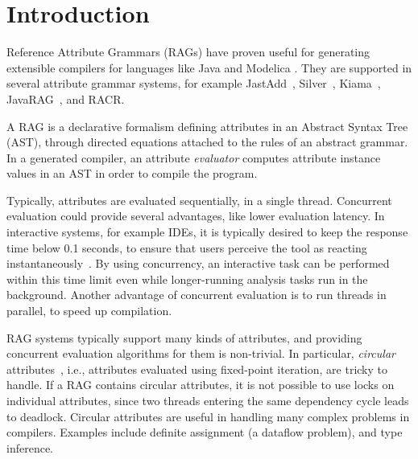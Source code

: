 {\section{Introduction}

Reference Attribute Grammars (RAGs) \cite{DBLP:journals/informaticaSI/Hedin00}
have proven useful for generating extensible compilers for languages
like Java \cite{DBLP:conf/ecoop/WykKBS07, jastaddj} and Modelica \cite{DBLP:journals/cce/AkessonAGBT10}. 
They are supported in several attribute grammar systems, for example
JastAdd~\cite{DBLP:journals/informaticaSI/Hedin00},
Silver~\cite{DBLP:journals/entcs/WykBGK08},
Kiama~\cite{DBLP:journals/entcs/SloaneKV10},
JavaRAG~\cite{DBLP:conf/aosd/ForsCH15},
and RACR\cite{DBLP:conf/sle/Burger15}.

A RAG is a declarative formalism defining attributes in an Abstract Syntax Tree (AST), through
directed equations attached to the rules of an abstract grammar. In a generated compiler,
an attribute \emph{evaluator} computes attribute instance values in an AST in order to compile the program.

Typically, attributes are evaluated sequentially, in a single thread.
Concurrent evaluation could provide several advantages, like lower evaluation latency.
In interactive systems, for example IDEs, it is typically desired to keep the response time below 0.1 seconds, to ensure that users perceive the tool as reacting instantaneously~\cite{DBLP:books/daglib/0076830}. By using concurrency, an interactive task can be performed within this
time limit even while
longer-running analysis tasks run in the background.
Another advantage of concurrent evaluation is to run threads in parallel, to speed up compilation.  


RAG systems typically support many kinds of attributes, and providing concurrent evaluation algorithms for them is non-trivial.
In particular, \emph{circular} attributes~\cite{DBLP:conf/sigplan/Farrow86, DBLP:journals/toplas/Jones90, DBLP:journals/entcs/MagnussonH03}, i.e., attributes evaluated using fixed-point iteration, are tricky to handle.
If a RAG contains circular attributes, it is not possible to use locks on individual attributes, since two threads entering the same dependency cycle leads to deadlock.
Circular attributes are useful in handling many complex problems in compilers. 
Examples include definite assignment (a dataflow problem), and type inference. 


}
